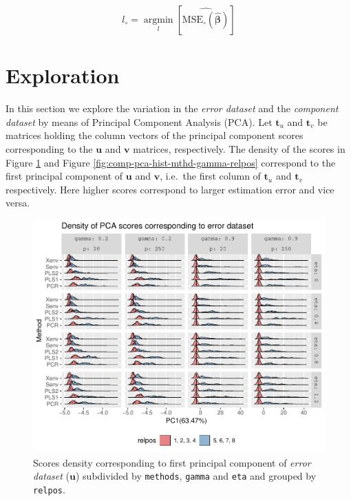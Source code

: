 \documentclass[12pt,3p,authoryear]{elsarticle}
\begin{document}
\begin{equation}
  l_{\circ} = \operatorname*{argmin}_{l}\left[\widehat{\text{MSE}_\circ\left(\widehat{\boldsymbol{\beta}}\right)}\right]
  \label{eq:min-comp}
\end{equation}

\hypertarget{exploration}{\section{Exploration}\label{exploration}}

In this section we explore the variation in the \emph{error dataset} and
the \emph{component dataset} by means of Principal Component Analysis
(PCA). Let \(\mathbf{t}_u\) and \(\mathbf{t}_v\) be matrices holding the
column vectors of the principal component scores corresponding to the
\(\mathbf{u}\) and \(\mathbf{v}\) matrices, respectively. The density of
the scores in Figure \ref{fig:est-pca-hist-mthd-gamma-relpos} and Figure
\ref{fig:comp-pca-hist-mthd-gamma-relpos} correspond to the first
principal component of \(\mathbf{u}\) and \(\mathbf{v}\), i.e.~the first
column of \(\mathbf{t}_u\) and \(\mathbf{t}_v\) respectively. Here
higher scores correspond to larger estimation error and vice versa.





\begin{figure}[!htb]
\includegraphics[width=1\linewidth]{Images/pdf/est-pca-hist-mthd-gamma-relpos-1} \caption{Scores density corresponding to first principal component
of \emph{error dataset} (\(\mathbf{u}\)) subdivided by \texttt{methods},
\texttt{gamma} and \texttt{eta} and grouped by \texttt{relpos}.}\label{fig:est-pca-hist-mthd-gamma-relpos}
\end{figure}
\end{document}
